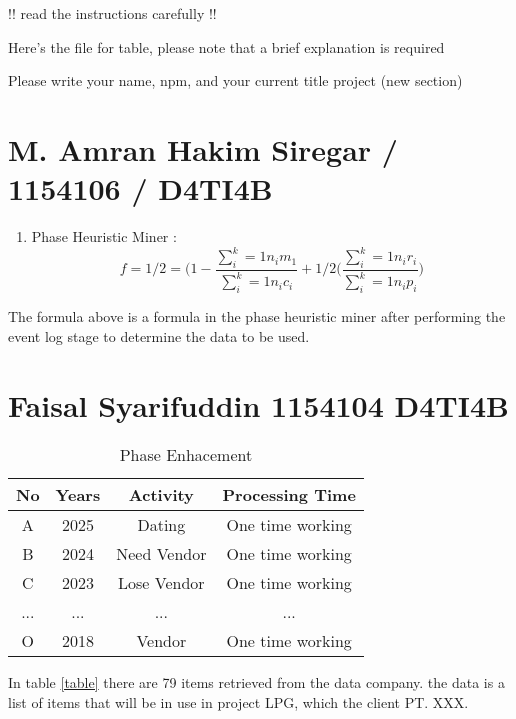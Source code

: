 !! read the instructions carefully !!

Here's the file for table, please note that a brief explanation is required

Please write your name, npm, and your current title project (new section)



\section{M. Amran Hakim Siregar / 1154106 / D4TI4B}
\begin{enumerate}
    \item Phase Heuristic Miner :
    \begin{equation}
        f=1/2=\bigg(1-\frac{\sum_{i}^{k}= 1 n_{i}m_{1}}{\sum_{i}^{k} = 1 n_{i}c_{i}}\bigg+ 1/2\big(\frac{\sum_{i}^{k}=1 n_{i}r_{i}}{\sum_{i}^{k}= 1 n_{i}p_{i}}\bigg)
    \end{equation}
\end{enumerate}
\par
The formula above is a formula in the phase heuristic miner after performing the event log stage to determine the data to be used.

\section{Faisal Syarifuddin 1154104 D4TI4B}

\begin{center}
    \begin{table}[hhhh]
    \caption{Phase Enhacement}
        \centering
        \begin{tabular}{cccc}
        \hline No & Years & Activity & Processing Time\\
        \hline
            A & 2025 & Dating & One time working  \\
            B & 2024 & Need Vendor & One time working  \\
            C & 2023 & Lose Vendor & One time working  \\
            ... & ... & ... & ...  \\
            O & 2018 & Vendor & One time working  \\
        \hline
        \end{tabular}
    \end{table}
\end{center}

\par In table \ref{table} there are 79 items retrieved from the data company. the data is a list of items that will be in use in project LPG, which the client PT. XXX.

